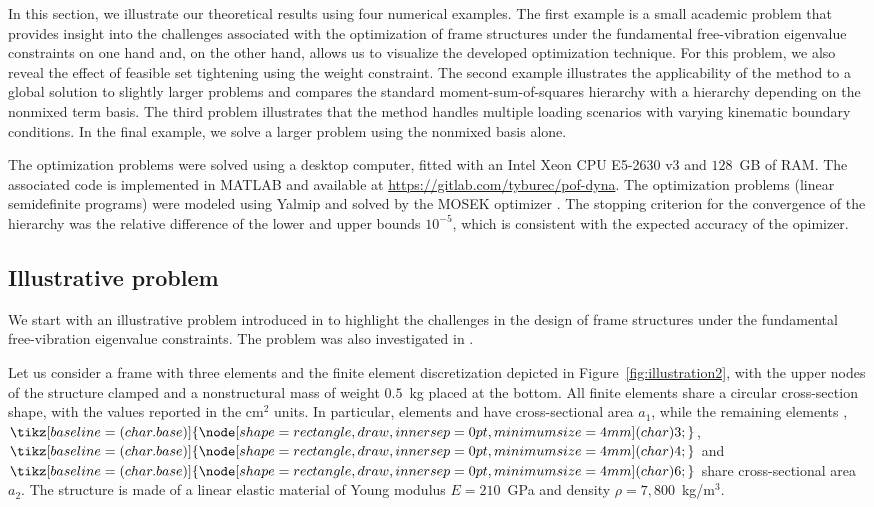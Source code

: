 \documentclass[final,onefignum,onetabnum]{siamart220329}
\newcommand*\squared[1]{\tikz[baseline=(char.base)]{
		\node[shape=rectangle,draw,inner sep=0pt, minimum size=4mm] (char) {#1};}}
\begin{document}
In this section, we illustrate our theoretical results using {four} numerical examples. The first example is a small academic problem that provides insight into the challenges associated with the optimization of frame structures under the fundamental free-vibration eigenvalue constraints on one hand and, on the other hand, allows us to visualize the developed optimization technique. For this problem, we also reveal the effect of {feasible set tightening using} the weight constraint. The second example illustrates the applicability of the method to a global solution to slightly larger problems and compares the standard moment-sum-of-squares hierarchy with a hierarchy depending on the nonmixed term basis. {The third problem illustrates that the method handles multiple loading scenarios with varying kinematic boundary conditions.} In the final example, we solve a larger problem using the nonmixed basis alone.

The optimization problems were solved using a desktop computer, fitted with an Intel Xeon CPU E5-2630 v3 and $128$~GB of RAM. The associated code is implemented in MATLAB and available at \url{https://gitlab.com/tyburec/pof-dyna}. The optimization problems {(linear semidefinite programs)} were modeled using Yalmip \cite{Lofberg2004} and solved by the MOSEK optimizer \cite{mosek}. {The stopping criterion for the convergence of the hierarchy was the relative difference of the lower and upper bounds $10^{-5}$, which is consistent with the expected accuracy of the opimizer.}

\subsection{Illustrative problem}\label{sec:illustrative}

We start with an illustrative problem introduced in \cite{Ni2014} to highlight the challenges in the design of frame structures under the fundamental free-vibration eigenvalue constraints. The problem was also investigated in \cite{Yamada2015}.

Let us consider a frame with three elements and the finite element discretization depicted in Figure~\ref{fig:illustration2}, with the upper nodes of the structure clamped and a nonstructural mass of weight $0.5$~kg placed at the bottom. All finite elements share a circular cross-section shape, with the values reported in the cm$^2$ units. In particular, elements \squared{2} and \squared{5} have cross-sectional area $a_1$, while the remaining elements \squared{1}, $\squared{3}$, $\squared{4}$ and $\squared{6}$ share cross-sectional area $a_2$. The structure is made of a linear elastic material of Young modulus $E=210$~GPa and density $\rho=7,800$~kg/m$^3$.
\end{document}

